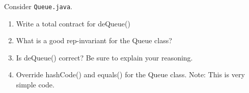 Consider {\tt Queue.java}.

\begin{enumerate}
\item
Write a total contract for deQueue()

\item
What is a good rep-invariant for the Queue class?

\item
Is deQueue() correct?  Be sure to explain your reasoning.

\item
Override hashCode() and equals() for the Queue class.  
Note: This is very simple code.

\end{enumerate}







